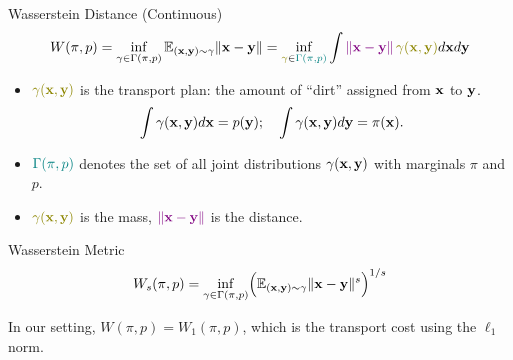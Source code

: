 \documentclass{beamer}
\begin{document}
\begin{frame}{Wasserstein Distance (Continuous)}
	\vspace{-0.5cm}
	\[
		W(\pi, p) = \inf_{\gamma \in \Gamma(\pi, p)} \bbE_{(\bx, \by) \sim \gamma} \| \bx - \by \| =  \inf_{{\color{olive}\gamma} \in {\color{teal}\Gamma(\pi, p)}} \int {\color{violet} \| \bx - \by \|}\, {\color{olive}\gamma (\bx, \by)} d \bx d \by
	\]
	\vspace{-0.4cm}
	\begin{itemize}
		\item ${\color{olive}\gamma (\bx, \by)}$ is the transport plan: the amount of “dirt” assigned from $\mathbf{x}$ to $\mathbf{y}$.
		\vspace{-0.2cm}
		\[
		\int \gamma(\mathbf{x}, \mathbf{y}) d \mathbf{x} = p(\mathbf{y}); \quad \int \gamma(\mathbf{x}, \mathbf{y}) d \mathbf{y} = \pi(\mathbf{x}).
		\]
		\vspace{-0.6cm}
		\item ${\color{teal}\Gamma(\pi, p)}$ denotes the set of all joint distributions $\gamma (\mathbf{x}, \mathbf{y})$ with marginals $\pi$ and $p$.
		\item ${\color{olive}\gamma(\bx, \by)}$ is the mass, ${\color{violet}\|\mathbf{x}-\mathbf{y}\|}$ is the distance.
	\end{itemize}
	\eqpause
	\begin{block}{Wasserstein Metric}
		\vspace{-0.2cm}
		\[
		W_s(\pi, p) = \inf_{\gamma \in \Gamma(\pi, p)} \Bigl(\mathbb{E}_{(\mathbf{x}, \mathbf{y}) \sim \gamma} \|\mathbf{x}-\mathbf{y}\|^s\Bigr)^{1/s}
		\]
		\vspace{-0.4cm}
	\end{block}
	In our setting, $W(\pi, p) = W_1(\pi, p)$, which is the transport cost using the $\ell_1$ norm.
\end{frame}
\end{document}
